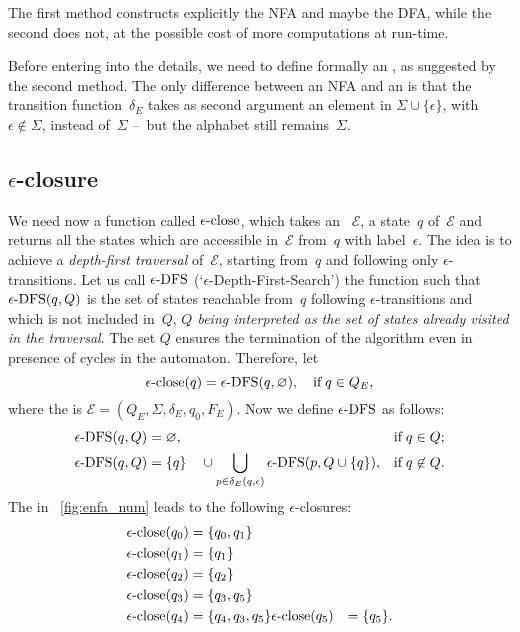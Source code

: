 The first method constructs explicitly the NFA and maybe the DFA,
while the second does not, at the possible cost of more computations
at run-time.

Before entering into the details, we need to define formally an \eNFA,
as suggested by the second method. The only difference between an NFA
and an \eNFA is that the transition function~\(\delta_E\) takes as
second argument an element in \(\Sigma \cup \{\epsilon\}\), with
\(\epsilon \not\in \Sigma\), instead of~\(\Sigma\) --~but the alphabet
still remains~\(\Sigma\).

\subsection*{$\epsilon$-closure}

We need now a function called \emph{\(\epsilon\text{-close}\)}, which takes an
\eNFA~\(\mathcal{E}\), a state~\(q\) of~\(\mathcal{E}\) and returns
all the states which are accessible in~\(\mathcal{E}\) from~\(q\) with
label~\(\epsilon\). The idea is to achieve a \emph{depth-first
  traversal} of~\(\mathcal{E}\), starting from~\(q\) and following
only \(\epsilon\)-transitions. Let us call \(\epsilon\text{-DFS}\)
(`\(\epsilon\)-Depth-First-Search') the function such that \(\epsilon\text{-DFS}(q,
Q)\) is the set of states reachable from~\(q\) following
\(\epsilon\)-transitions and which is not included in~\(Q\),
\emph{\(Q\) being interpreted as the set of states already visited in
  the traversal}. The set \(Q\) ensures the termination of the
algorithm even in presence of cycles in the automaton. Therefore, let
\begin{equation*}
\epsilon\text{-close} (q) = \epsilon\text{-DFS} (q, \varnothing), \quad \text{if} \; q \in Q_E,
\end{equation*}
where the \eNFA is \(\mathcal{E} = (Q_E, \Sigma, \delta_E, q_0,
F_E)\). Now we define \(\epsilon\text{-DFS}\) as follows:
\begin{align}
   \epsilon\text{-DFS} (q, Q) 
&= \varnothing,
& \text{if} \; q \in Q; \label{eDFS_1}\\
  \epsilon\text{-DFS} (q, Q)
&= \{q\} \quad \cup \bigcup_{p \in \delta_E(q,\epsilon)}{\epsilon\text{-DFS} (p, Q
    \cup \{q\})},
& \text{if} \; q \not\in Q. \label{eDFS_2}
\end{align}
The \eNFA in \fig~\vref{fig:enfa_num} leads to the following
\(\epsilon\)-closures:
\begin{align*}
    \epsilon\text{-close} (q_0) &= \{q_0, q_1\}\\
    \epsilon\text{-close} (q_1) &= \{q_1\}\\
    \epsilon\text{-close} (q_2) &= \{q_2\}\\
    \epsilon\text{-close} (q_3) &= \{q_3, q_5\}\\
    \epsilon\text{-close} (q_4) &= \{q_4, q_3, q_5\}
    \epsilon\text{-close} (q_5) &= \{q_5\}.
\end{align*}
